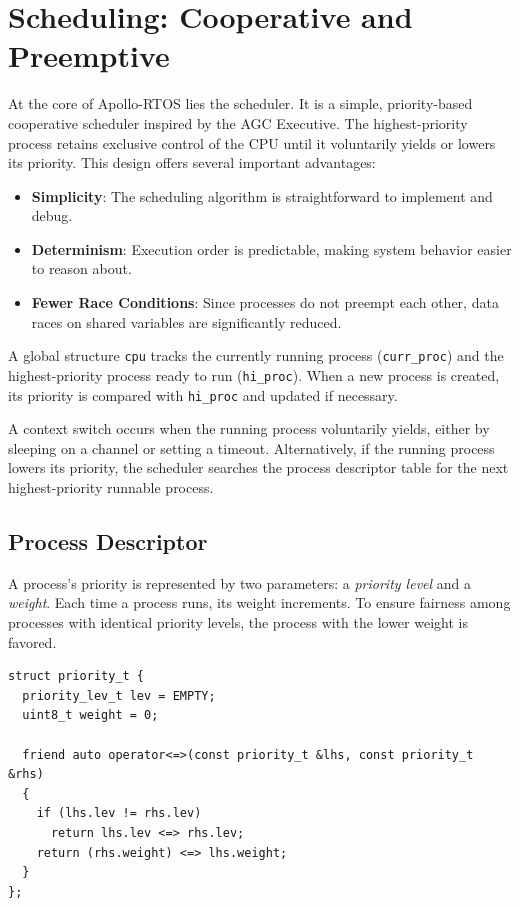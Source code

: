\section{Scheduling: Cooperative and Preemptive}
\label{sec:sched}

At the core of Apollo-RTOS lies the scheduler. It is a simple, priority-based
cooperative scheduler inspired by the AGC Executive. The highest-priority process
retains exclusive control of the CPU until it voluntarily yields or lowers its priority.
This design offers several important advantages:
\begin{itemize}
    \item \textbf{Simplicity}: The scheduling algorithm is straightforward to
        implement and debug.
    \item \textbf{Determinism}: Execution order is predictable, making system behavior
        easier to reason about.
    \item \textbf{Fewer Race Conditions}: Since processes do not preempt each other,
        data races on shared variables are significantly reduced.
\end{itemize}

A global structure \lstinline[style=myagc]|cpu| tracks the currently running process
(\lstinline[style=myagc]|curr_proc|) and the highest-priority process ready to run
(\lstinline[style=myagc]|hi_proc|). When a new process is created, its priority is
compared with \lstinline[style=myagc]|hi_proc| and updated if necessary.

A context switch occurs when the running process voluntarily yields, either by sleeping
on a channel or setting a timeout. Alternatively, if the running process lowers its
priority, the scheduler searches the process descriptor table for the next highest-priority
runnable process.

\subsection{Process Descriptor}

\begin{emptythm}
    A process’s priority is represented by two parameters: a \textit{priority level}
    and a \textit{weight}. Each time a process runs, its weight increments. To ensure
    fairness among processes with identical priority levels, the process with the lower
    weight is favored.
\end{emptythm}

\begin{lstlisting}[style=myagc, caption={\file{include/core/procs.h}}]
struct priority_t {
  priority_lev_t lev = EMPTY;
  uint8_t weight = 0;

  friend auto operator<=>(const priority_t &lhs, const priority_t &rhs)
  {
    if (lhs.lev != rhs.lev)
      return lhs.lev <=> rhs.lev;
    return (rhs.weight) <=> lhs.weight;
  }
};
\end{lstlisting}


